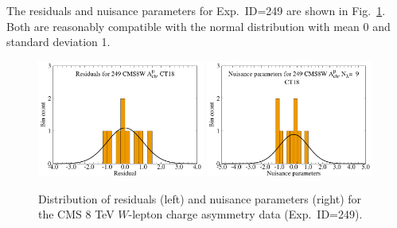 The residuals and nuisance parameters for Exp.~ID=249 are shown in
Fig.~\ref{fig:resnui249}. Both are reasonably compatible with the
normal distribution with mean 0 and standard deviation 1. 
%
\begin{figure}[htbp]
	\includegraphics[width=0.49\textwidth]{./fig/SuppMat/res_his_CT18-249_4_ect.pdf}
	\includegraphics[width=0.49\textwidth]{./fig/SuppMat/rk_his_CT18-249__4_ect.pdf}
	\caption{Distribution of residuals (left) and nuisance parameters (right) for the CMS 8 TeV $W$-lepton charge asymmetry data (Exp.~ID=249).
	}
\label{fig:resnui249}
\end{figure}


